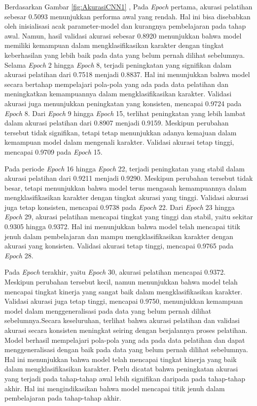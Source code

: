 Berdasarkan Gambar \ref{fig:AkurasiCNN1} , Pada \textit{Epoch} pertama, akurasi pelatihan sebesar 0.5093 menunjukkan performa awal yang rendah. Hal ini bisa disebabkan oleh inisialisasi acak parameter-model dan kurangnya pembelajaran pada tahap awal. Namun, hasil validasi akurasi sebesar 0.8920 menunjukkan bahwa model memiliki kemampuan dalam mengklasifikasikan karakter dengan tingkat keberhasilan yang lebih baik pada data yang belum pernah dilihat sebelumnya. Selama \textit{Epoch} 2 hingga \textit{Epoch} 8, terjadi peningkatan yang signifikan dalam akurasi pelatihan dari 0.7518 menjadi 0.8837. Hal ini menunjukkan bahwa model secara bertahap mempelajari pola-pola yang ada pada data pelatihan dan meningkatkan kemampuannya dalam mengklasifikasikan karakter. Validasi akurasi juga menunjukkan peningkatan yang konsisten, mencapai 0.9724 pada \textit{Epoch} 8. Dari \textit{Epoch} 9 hingga \textit{Epoch} 15, terlihat peningkatan yang lebih lambat dalam akurasi pelatihan dari 0.8907 menjadi 0.9159. Meskipun perubahan tersebut tidak signifikan, tetapi tetap menunjukkan adanya kemajuan dalam kemampuan model dalam mengenali karakter. Validasi akurasi tetap tinggi, mencapai 0.9709 pada \textit{Epoch} 15.

Pada periode \textit{Epoch} 16 hingga \textit{Epoch} 22, terjadi peningkatan yang stabil dalam akurasi pelatihan dari 0.9211 menjadi 0.9290. Meskipun perubahan tersebut tidak besar, tetapi menunjukkan bahwa model terus mengasah kemampuannya dalam mengklasifikasikan karakter dengan tingkat akurasi yang tinggi. Validasi akurasi juga tetap konsisten, mencapai 0.9738 pada \textit{Epoch} 22. Dari \textit{Epoch} 23 hingga \textit{Epoch} 29, akurasi pelatihan mencapai tingkat yang tinggi dan stabil, yaitu sekitar 0.9305 hingga 0.9372. Hal ini menunjukkan bahwa model telah mencapai titik jenuh dalam pembelajaran dan mampu mengklasifikasikan karakter dengan akurasi yang konsisten. Validasi akurasi tetap tinggi, mencapai 0.9765 pada \textit{Epoch} 28. 

Pada \textit{Epoch} terakhir, yaitu \textit{Epoch} 30, akurasi pelatihan mencapai 0.9372. Meskipun perubahan tersebut kecil, namun menunjukkan bahwa model telah mencapai tingkat kinerja yang sangat baik dalam mengklasifikasikan karakter. Validasi akurasi juga tetap tinggi, mencapai 0.9750, menunjukkan kemampuan model dalam menggeneralisasi pada data yang belum pernah dilihat sebelumnya.Secara keseluruhan, terlihat bahwa akurasi pelatihan dan validasi akurasi secara konsisten meningkat seiring dengan berjalannya proses pelatihan. Model berhasil mempelajari pola-pola yang ada pada data pelatihan dan dapat menggeneralisasi dengan baik pada data yang belum pernah dilihat sebelumnya. Hal ini menunjukkan bahwa model telah mencapai tingkat kinerja yang baik dalam mengklasifikasikan karakter. Perlu dicatat bahwa peningkatan akurasi yang terjadi pada tahap-tahap awal lebih signifikan daripada pada tahap-tahap akhir. Hal ini mengindikasikan bahwa model mencapai titik jenuh dalam pembelajaran pada tahap-tahap akhir.


